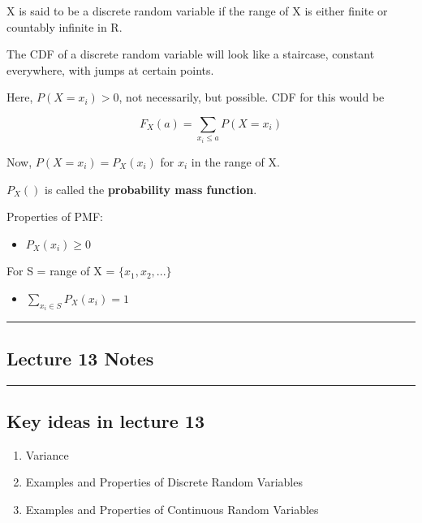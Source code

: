 X is said to be a discrete random variable if the range of X is either
finite or countably infinite in R.

The CDF of a discrete random variable will look like a staircase,
constant everywhere, with jumps at certain points.

Here, \(P(X = x_i) > 0\), not necessarily, but possible. CDF for this
would be

\[F_X(a) = \displaystyle\sum_{x_i \leq a} P(X = x_i)\]

Now, \(P(X = x_i) = P_X(x_i)\) for \(x_i\) in the range of X.

\(P_X()\) is called the \textbf{probability mass function}.

Properties of PMF:

\begin{itemize}
\tightlist
\item
  \(P_X(x_i) \geq 0\)
\end{itemize}

For S = range of X = \(\{x_1, x_2, ...\}\)

\begin{itemize}
\tightlist
\item
  \(\displaystyle\sum_{x_i \in S} P_X(x_i) = 1\)
\end{itemize}

\begin{center}\rule{0.5\linewidth}{0.5pt}\end{center}

\hypertarget{lecture-13-notes}{%
\subsection{Lecture 13 Notes}\label{lecture-13-notes}}

\begin{center}\rule{0.5\linewidth}{0.5pt}\end{center}

\hypertarget{key-ideas-in-lecture-13}{%
\subsection{Key ideas in lecture 13}\label{key-ideas-in-lecture-13}}

\begin{enumerate}
\def\labelenumi{\arabic{enumi}.}
\tightlist
\item
  Variance
\item
  Examples and Properties of Discrete Random Variables
\item
  Examples and Properties of Continuous Random Variables
\end{enumerate}

